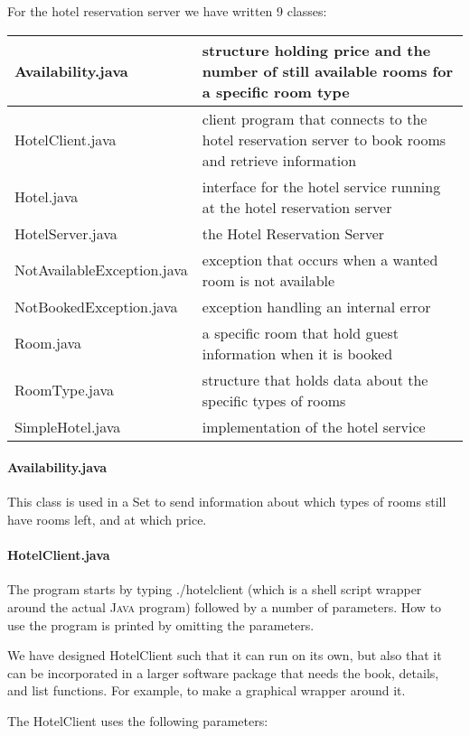\documentclass[a4paper,10pt]{article}
\begin{document}
For the hotel reservation server we have written 9 classes:
\begin{center}
\begin{tabular}{ l | p{7.0cm} }
Availability.java & structure holding price and the number of still available rooms for a specific room type\\ \hline
HotelClient.java & client program that connects to the hotel reservation server to book rooms and retrieve information\\ \hline
Hotel.java & interface for the hotel service running at the hotel reservation server\\ \hline
HotelServer.java & the Hotel Reservation Server\\ \hline
NotAvailableException.java & exception that occurs when a wanted room is not available\\ \hline
NotBookedException.java & exception handling an internal error\\ \hline
Room.java & a specific room that hold guest information when it is booked\\ \hline
RoomType.java & structure that holds data about the specific types of rooms\\ \hline
SimpleHotel.java & implementation of the hotel service\\
\end{tabular}
\end{center}

\paragraph{Availability.java}
This class is used in a Set to send information about which types of rooms still have rooms left, and at which price.

\paragraph{HotelClient.java}
The program starts by typing ./hotelclient (which is a shell script wrapper around the actual \textsc{Java} program) followed by a number of parameters. How to use the program is printed by omitting the parameters.

We have designed HotelClient such that it can run on its own, but also that it can be incorporated in a larger software package that needs the book, details, and list functions. For example, to make a graphical wrapper around it.

The HotelClient uses the following parameters:
\end{document}
